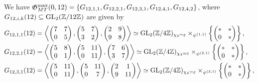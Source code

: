 We have $\mathfrak{G}_{MT}^{\max}(0,12) = \{ G_{12,1,1}, G_{12,2,1}, G_{12,3,1}, G_{12,4,1}, G_{12,4,2} \}$, where $G_{12,i,k}(12) \subseteq \operatorname{GL}_2(\mathbb{Z}/12\mathbb{Z})$ are given by
\begin{equation} \label{descriptionofgroupslevel12}
\begin{split}
G_{12,1,1}(12) &= \left\langle \begin{pmatrix} 7 & 7 \\ 0 & 5 \end{pmatrix}, \begin{pmatrix} 5 & 7 \\ 3 & 2 \end{pmatrix}, \begin{pmatrix} 2 & 9 \\ 9 & 8 \end{pmatrix} \right\rangle \simeq \GL_2(\mbz/4\mbz)_{\chi_4 = \ve} \times_{\psi^{(1,1)}} \left\{ \begin{pmatrix} * & * \\ 0 & * \end{pmatrix} \right\}, \\
G_{12,2,1}(12) &= \left\langle \begin{pmatrix} 5 & 8 \\ 0 & 1 \end{pmatrix}, \begin{pmatrix} 5 & 11 \\ 0 & 11 \end{pmatrix}, \begin{pmatrix} 7 & 6 \\ 3 & 7 \end{pmatrix} \right\rangle \simeq \GL_2(\mbz/4\mbz)_{\chi_4 = \ve} \times_{\psi^{(2,1)}} \left\{ \begin{pmatrix} * & * \\ 0 & * \end{pmatrix} \right\}, \\
G_{12,3,1}(12) &= \left\langle \begin{pmatrix} 5 & 11 \\ 0 & 11 \end{pmatrix}, \begin{pmatrix} 5 & 11 \\ 0 & 7 \end{pmatrix}, \begin{pmatrix} 2 & 1 \\ 9 & 11 \end{pmatrix} \right\rangle\simeq \GL_2(\mbz/4\mbz)_{\chi_4 = \ve} \times_{\psi^{(3,1)}} \left\{ \begin{pmatrix} * & * \\ 0 & * \end{pmatrix} \right\}, \\

\end{split}
\end{equation}
